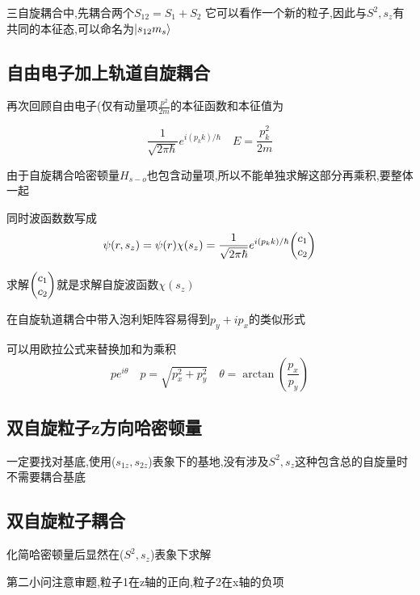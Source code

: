 \documentclass{article}
\begin{document}
            \begin{formal}
                三自旋耦合中,先耦合两个$S_{12} = S_{1}+S_{2}$ 它可以看作一个新的粒子,因此与$S^{2},s_{z}$有共同的本征态,可以命名为$\ket{s_{12}m_{s}}$
            \end{formal}

        \subsection{自由电子加上轨道自旋耦合}
            再次回顾自由电子(仅有动量项$\frac{p^{2}}{2m}$的本征函数和本征值为

            $$
            \frac{1}{\sqrt{2\pi \hbar}}e^{i(p_{k}k)/\hbar} \quad E = \frac{p_{k}^{2}}{2m} 
            $$

            由于自旋耦合哈密顿量$H_{s-o}$也包含动量项,所以不能单独求解这部分再乘积,要整体一起

            同时波函数数写成
            $$
            \psi(r,s_{z}) = \psi(r) \chi(s_{z}) = \frac{1}{\sqrt{2\pi \hbar}}e^{i(p_{k}k)/\hbar} \mqty(c_{1} \\ c_{2})
            $$

            求解$\mqty(c_{1} \\ c_{2})$就是求解自旋波函数$\chi(s_{z})$

            \begin{formal}
                在自旋轨道耦合中带入泡利矩阵容易得到$ p_{y} + ip_{x} $的类似形式
                
                可以用欧拉公式来替换加和为乘积
                $$
                p e^{i \theta} \quad p = \sqrt{ p_{x}^{2} + p_{y}^{2} } \quad \theta = \arctan{(\frac{p_{x}}{p_{y}})}
                $$
            \end{formal}
            

        \subsection{双自旋粒子z方向哈密顿量}
            一定要找对基底,使用($s_{1z},s_{2z}$)表象下的基地,没有涉及$S^{2},s_{z}$这种包含总的自旋量时不需要耦合基底

        \subsection{双自旋粒子耦合}
            化简哈密顿量后显然在($S^{2},s_{z}$)表象下求解

            第二小问注意审题,粒子1在z轴的正向,粒子2在x轴的负项
\end{document}
